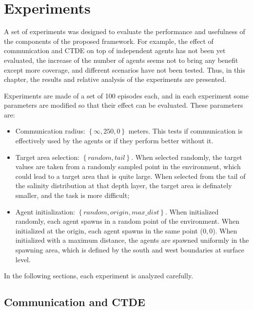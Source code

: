 \chapter{Experiments}

A set of experiments was designed to evaluate the performance and usefulness of the components of the proposed framework. 
For example, the effect of communication and CTDE on top of independent agents has not been yet evaluated,
the increase of the number of agents seems not to bring any benefit except more coverage, and different scenarios 
have not been tested. Thus, in this chapter, the results and relative analysis of the experiments are presented.

Experiments are made of a set of 100 episodes each, and in each experiment some parameters are modified so that 
their effect can be evaluated. These parameters are:
\begin{itemize}
    \item Communication radius: $\left\{\infty, 250, 0\right\}$ meters. This tests if communication is effectively used by the agents or if they perform better without it.
    \item Target area selection: $\left\{random,tail\right\}$. When selected randomly, the target values are taken from a randomly
    sampled point in the environment, which could lead to a target area that is quite large. When selected from the tail of the salinity distribution at that depth layer, 
    the target area is definately smaller, and the task is more difficult;
    \item Agent initialization: $\left\{random,origin,max\_dist\right\}$. When initialized randomly, each agent spawns in a random point of the environment. When initialized 
    at the origin, each agent spawns in the same point ($0,0$). When initialized with a maximum distance, the agents are spawned uniformly in the spawning area, which is defined by the south and west boundaries at surface level.
\end{itemize}

In the following sections, each experiment is analyzed carefully.

\section{Communication and CTDE}

